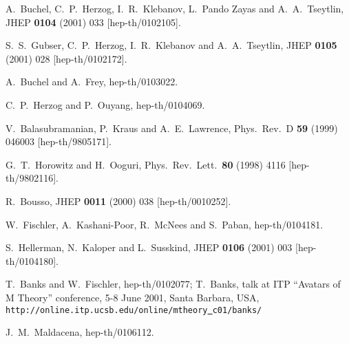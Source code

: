 \documentclass[a4paper,12pt]{amsproc}
\numberwithin{equation}{section}
\providecommand{\ul}[1]{\underline{#1}} %
\begin{document}
\begin{thebibliography}{99}
 A.~Buchel, C.~P.~Herzog, I.~R.~Klebanov, L.~Pando
Zayas and A.~A.~Tseytlin,
JHEP {\bf 0104} (2001) 033 [hep-th/0102105].

 S.~S.~Gubser, C.~P.~Herzog, I.~R.~Klebanov and
A.~A.~Tseytlin,
JHEP {\bf 0105} (2001) 028 [hep-th/0102172].

 A.~Buchel and A.~Frey,
hep-th/0103022.

 C.~P.~Herzog and P.~Ouyang,
hep-th/0104069.

 V.~Balasubramanian, P.~Kraus and A.~E.~Lawrence,
Phys.\ Rev.\ D {\bf 59} (1999) 046003
[hep-th/9805171].

 G.~T.~Horowitz and H.~Ooguri,
Phys.\ Rev.\ Lett.\  {\bf 80} (1998) 4116
[hep-th/9802116].

 R.~Bousso,
JHEP {\bf 0011} (2000) 038
[hep-th/0010252].

 W.~Fischler, A.~Kashani-Poor, R.~McNees and S.~Paban,
hep-th/0104181.

 S.~Hellerman, N.~Kaloper and L.~Susskind,
JHEP {\bf 0106} (2001) 003
[hep-th/0104180].

 T.~Banks and W.~Fischler,
hep-th/0102077; T.~Banks, talk at ITP ``Avatars of M Theory''
conference, 5-8 June 2001, Santa Barbara, USA,
{\tt http://online.itp.ucsb.edu/online/mtheory{\ul{\
}}c01/banks/}

 J.~M.~Maldacena, 
hep-th/0106112.

\end{thebibliography}
\end{document}

